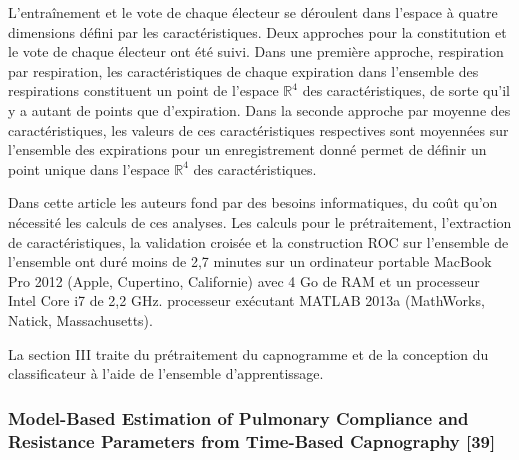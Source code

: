 \documentclass[12pt,]{article}
\begin{document}
L'entraînement et le vote de chaque électeur se déroulent dans l'espace
à quatre dimensions défini par les caractéristiques. Deux approches pour
la constitution et le vote de chaque électeur ont été suivi. Dans une
première approche, respiration par respiration, les caractéristiques de
chaque expiration dans l'ensemble des respirations constituent un point
de l'espace \(\mathbb R^{4}\) des caractéristiques, de sorte qu'il y a
autant de points que d'expiration. Dans la seconde approche par moyenne
des caractéristiques, les valeurs de ces caractéristiques respectives
sont moyennées sur l'ensemble des expirations pour un enregistrement
donné permet de définir un point unique dans l'espace \(\mathbb R^{4}\)
des caractéristiques.

Dans cette article les auteurs fond par des besoins informatiques, du
coût qu'on nécessité les calculs de ces analyses. Les calculs pour le
prétraitement, l'extraction de caractéristiques, la validation croisée
et la construction ROC sur l'ensemble de l'ensemble ont duré moins de
2,7 minutes sur un ordinateur portable MacBook Pro 2012 (Apple,
Cupertino, Californie) avec 4 Go de RAM et un processeur Intel Core i7
de 2,2 GHz. processeur exécutant MATLAB 2013a (MathWorks, Natick,
Massachusetts).

La section III traite du prétraitement du capnogramme et de la
conception du classificateur à l'aide de l'ensemble d'apprentissage.

\subsubsection{Model-Based Estimation of Pulmonary Compliance and
Resistance Parameters from Time-Based Capnography
{[}39{]}}\label{model-based-estimation-of-pulmonary-compliance-and-resistance-parameters-from-time-based-capnography-abid2015model}
\end{document}
